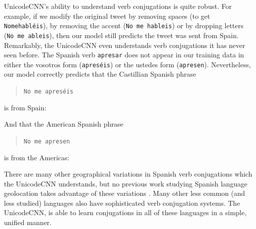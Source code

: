 \documentclass[sigconf,10pt]{acmart}
\newcommand{\str}[1]{\texttt{#1}}
\begin{document}
\begin{description}
UnicodeCNN's ability to understand verb conjugations is quite robust.
For example, if we modify the original tweet by removing spaces (to get \str{Nomehabl\'eis}),
by removing the accent (\str{No me hableis})
or by dropping letters (\str{No me ableis}),
then our model still predicts the tweet was sent from Spain.
%
%
Remarkably, the UnicodeCNN even understands verb conjugations it has never seen before.
The Spanish verb \str{apresar} does not appear in our training data in either the vosotros form (\str{apres\'eis}) or the ustedes form (\str{apresen}).
Nevertheless, our model correctly predicts that the Castillian Spanish phrase
\begin{quote}
    \str{No me apres\'eis}
\end{quote}
is from Spain:

\noindent

\noindent
And that the American Spanish phrase 
\begin{quote}
    \str{No me apresen}
\end{quote}
is from the Americas:

\noindent

There are many other geographical variations in Spanish verb conjugations which the UnicodeCNN understands,
but no previous work studying Spanish language geolocation takes advantage of these variations \citep{maier2014language,gonccalves2015learning,tinoco2017variation,han2014text}. 
Many other less common (and less studied) languages also have sophisticated verb conjugation systems.
The UnicodeCNN, is able to learn conjugations in all of these languages in a simple, unified manner.


\end{description}
\end{document}
